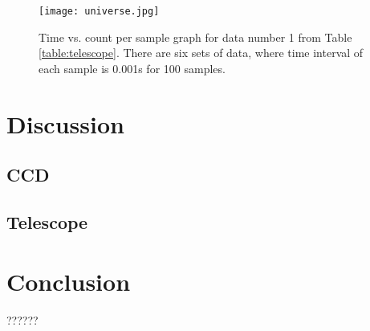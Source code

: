 \documentclass[a4paper,12pt]{article}
\begin{document}
\begin{figure}[H]
\centering
\texttt{[image: universe.jpg]}
\caption{Time vs. count per sample graph for data number 1 from Table \ref{table:telescope}. There are six sets of data, where time interval of each sample is 0.001s for 100 samples.}
\label{fig:task1_plots}
\end{figure}

\section{Discussion}
\label{sec:discuss}

\subsection{CCD} 
\label{sec:ccd}

\subsection{Telescope} 
\label{sec:telescope}

\section{Conclusion}
??????

%
%
\end{document}
